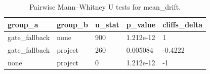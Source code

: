 \begin{table}
\caption{Pairwise Mann--Whitney U tests for mean_drift.}
\label{tab:mean_drift_pairwise}
\begin{tabular}{lllll}
\toprule
group_a & group_b & u_stat & p_value & cliffs_delta \\
\midrule
gate_fallback & none & 900 & 1.212e-12 & 1 \\
gate_fallback & project & 260 & 0.005084 & -0.4222 \\
none & project & 0 & 1.212e-12 & -1 \\
\bottomrule
\end{tabular}
\end{table}
